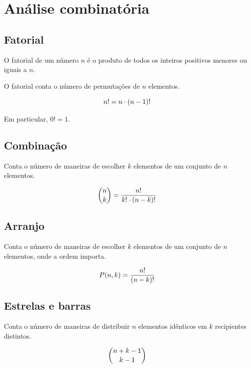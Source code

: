 \section{Análise combinatória}

\subsection{Fatorial}

O fatorial de um número $n$ é o produto de todos os inteiros positivos menores ou iguais a $n$.

O fatorial conta o número de permutações de $n$ elementos.

\begin{equation*}
\large
n! = n \cdot (n-1)!
\end{equation*}

Em particular, $0! = 1$.

\subsection{Combinação}

Conta o número de maneiras de escolher $k$ elementos de um conjunto de $n$ elementos.

\begin{equation*}
\large
\binom{n}{k} = \frac{n!}{k! \cdot (n-k)!}
\end{equation*}

\subsection{Arranjo}

Conta o número de maneiras de escolher $k$ elementos de um conjunto de $n$ elementos, onde a ordem importa.

\begin{equation*}
\large
P(n, k) = \frac{n!}{(n-k)!}
\end{equation*}

\subsection{Estrelas e barras}

Conta o número de maneiras de distribuir $n$ elementos idênticos em $k$ recipientes distintos.

\begin{equation*}
\large
\binom{n+k-1}{k-1}
\end{equation*}

